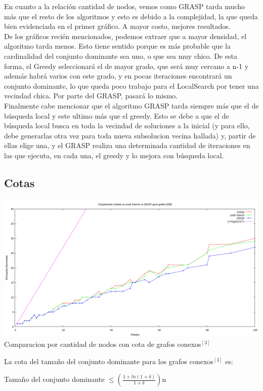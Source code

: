 En cuanto a la relación cantidad de nodos, vemos como GRASP tarda mucho más que el resto de los algoritmos 
y esto es debido a la complejidad, la que queda bien evidenciada en el primer gráfico. A mayor costo, mejores resultados.\\
De los gráficos recién mencionados, podemos extraer que a mayor densidad, el algoritmo tarda menos.
Esto tiene sentido porque es más probable que la cardinalidad del conjunto dominante sea uno, o que sea muy chico.
De esta forma, el Greedy seleccionará el de mayor grado, que será muy cercano a n-1 y además habrá varios con este grado, y en pocas iteraciones
encontrará un conjunto dominante, lo que queda poco trabajo para el LocalSearch por tener una vecindad chica.
Por parte del GRASP, pasará lo mismo.\\
Finalmente cabe mencionar que el algoritmo GRASP tarda siempre más que el de búsqueda local y este ultimo más que el
greedy. Esto se debe a que el de búsqueda local busca en toda la vecindad de soluciones a la inicial (y para ello, debe generarlas otra vez para toda nueva subsolucion vecina hallada) y, partir de ellas elige una, y el GRASP realiza una determinada cantidad de iteraciones en las que ejecuta, en cada una, el greedy y lo mejora con búsqueda local.

\subsection{Cotas}

\begin{center}
\includegraphics[width=17cm]{./graficos/comparacion_heuristicas_cd.png}\\
Comparacion por cantidad de nodos con cota de grafos conexos$^{[3]}$
\end{center}

La cota del tamaño del conjunto dominante para los grafos conexos$^{[3]}$ es:\\
\begin{center}
Tamaño del conjunto dominante $\leq (\frac {1+ln(1+\delta)}{1+\delta})$n 
\end{center}

